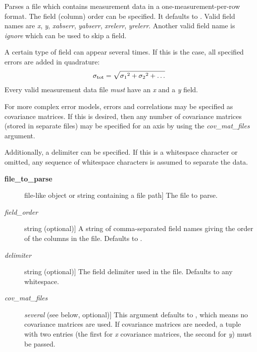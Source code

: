 \documentclass[a4paper,10pt,english]{sphinxmanual}
\begin{document}

\begin{fulllineitems}
\label{index:kafe.file_tools.parse_column_data}
Parses a file which contains measurement data in a one-measurement-per-row
format. The field (column) order can be specified. It defaults to
.
Valid field names are \emph{x}, \emph{y}, \emph{xabserr}, \emph{yabserr}, \emph{xrelerr},
\emph{yrelerr}. Another valid field name is \emph{ignore} which can be used to skip
a field.

A certain type of field can appear several times. If this is the case, all
specified errors are added in quadrature:
\begin{gather}
\begin{split}\sigma_{\text{tot}} = \sqrt{{\sigma_1}^2+{\sigma_2}^2+\dots}\end{split}\notag
\end{gather}
Every valid measurement data file \emph{must} have an \emph{x} and a \emph{y} field.

For more complex error models, errors and correlations may be specified as
covariance matrices. If this is desired, then any number of covariance
matrices (stored in separate files) may be specified for an axis by
using the \emph{cov\_mat\_files} argument.

Additionally, a delimiter can be specified. If this is a whitespace
character or omitted, any sequence of whitespace characters is assumed to
separate the data.
\begin{description}
\item[{\textbf{file\_to\_parse}}] \leavevmode{[}file-like object or string containing a file path{]}
The file to parse.

\item[{\emph{field\_order}}] \leavevmode{[}string (optional){]}
A string of comma-separated field names giving the order of the columns
in the file. Defaults to .

\item[{\emph{delimiter}}] \leavevmode{[}string (optional){]}
The field delimiter used in the file. Defaults to any whitespace.

\item[{\emph{cov\_mat\_files}}] \leavevmode{[}\emph{several} (see below, optional){]}
This argument defaults to , which means no covariance matrices
are used. If covariance matrices are needed, a tuple with two entries
(the first for \emph{x} covariance matrices, the second for \emph{y}) must be
passed.


\end{description}
\end{fulllineitems}
\end{document}

